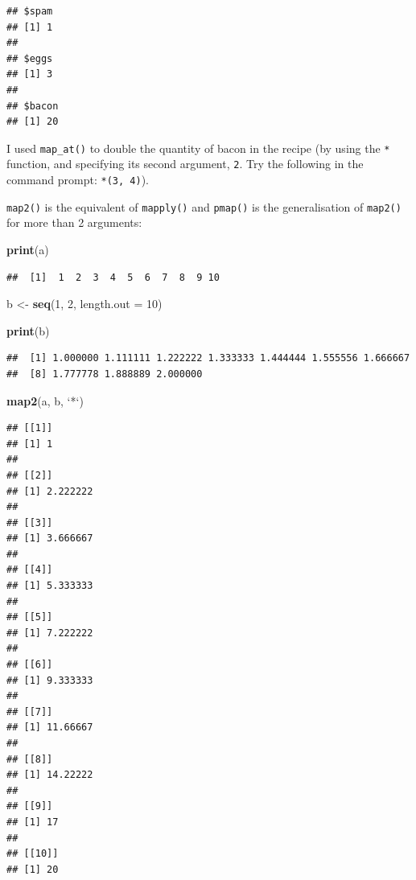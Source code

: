 \documentclass[]{gitbook}
\newenvironment{Shaded}{\begin{snugshade}}{\end{snugshade}}
\newcommand{\DataTypeTok}[1]{\textcolor[rgb]{0.13,0.29,0.53}{#1}}
\newcommand{\DecValTok}[1]{\textcolor[rgb]{0.00,0.00,0.81}{#1}}
\newcommand{\KeywordTok}[1]{\textcolor[rgb]{0.13,0.29,0.53}{\textbf{#1}}}
\newcommand{\NormalTok}[1]{#1}
\newcommand{\StringTok}[1]{\textcolor[rgb]{0.31,0.60,0.02}{#1}}
\begin{document}
\begin{verbatim}
## $spam
## [1] 1
## 
## $eggs
## [1] 3
## 
## $bacon
## [1] 20
\end{verbatim}

I used \texttt{map\_at()} to double the quantity of bacon in the recipe (by using the \texttt{*} function, and specifying
its second argument, \texttt{2}. Try the following in the command prompt: \texttt{\textasciigrave{}*\textasciigrave{}(3,\ 4)}).

\texttt{map2()} is the equivalent of \texttt{mapply()} and \texttt{pmap()} is the generalisation of \texttt{map2()} for more
than 2 arguments:

\begin{Shaded}
\begin{Highlighting}[]
\KeywordTok{print}\NormalTok{(a)}
\end{Highlighting}
\end{Shaded}

\begin{verbatim}
##  [1]  1  2  3  4  5  6  7  8  9 10
\end{verbatim}

\begin{Shaded}
\begin{Highlighting}[]
\NormalTok{b <-}\StringTok{ }\KeywordTok{seq}\NormalTok{(}\DecValTok{1}\NormalTok{, }\DecValTok{2}\NormalTok{, }\DataTypeTok{length.out =} \DecValTok{10}\NormalTok{)}

\KeywordTok{print}\NormalTok{(b)}
\end{Highlighting}
\end{Shaded}

\begin{verbatim}
##  [1] 1.000000 1.111111 1.222222 1.333333 1.444444 1.555556 1.666667
##  [8] 1.777778 1.888889 2.000000
\end{verbatim}

\begin{Shaded}
\begin{Highlighting}[]
\KeywordTok{map2}\NormalTok{(a, b, }\StringTok{`}\DataTypeTok{*}\StringTok{`}\NormalTok{)}
\end{Highlighting}
\end{Shaded}

\begin{verbatim}
## [[1]]
## [1] 1
## 
## [[2]]
## [1] 2.222222
## 
## [[3]]
## [1] 3.666667
## 
## [[4]]
## [1] 5.333333
## 
## [[5]]
## [1] 7.222222
## 
## [[6]]
## [1] 9.333333
## 
## [[7]]
## [1] 11.66667
## 
## [[8]]
## [1] 14.22222
## 
## [[9]]
## [1] 17
## 
## [[10]]
## [1] 20
\end{verbatim}
\end{document}
